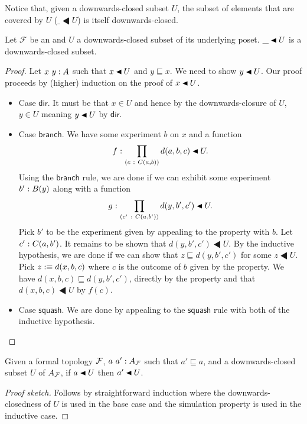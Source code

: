 Notice that, given a downwards-closed subset $U$, the subset of elements that are covered
by $U$ ($\_ \LHD U$) is itself downwards-closed.
\begin{prop}
  Let $\mathcal{F}$ be an \verintrsys{} and $U$ a downwards-closed subset of its
  underlying poset. $\covers{\_}{U}$ is a downwards-closed subset.
\end{prop}
\begin{proof}
  Let $x~y:A$ such that $\covers{x}{U}$ and $y \sqsubseteq x$. We need to show
  $\covers{y}{U}$. Our proof proceeds by (higher) induction on the proof of
  $\covers{x}{U}$.
  \begin{itemize}
    \item Case $\mathsf{dir}$. It must be that $x \in U$ and hence by the downwards-closure
      of $U$, $y \in U$ meaning $\covers{y}{U}$ by $\mathsf{dir}$.
    \item Case $\mathsf{branch}$. We have some experiment $b$ on $x$ and a function
      $$\oftyI{f}{\pity{c}{C(a, b)}{d(a, b, c) \LHD U}}.$$
      Using the $\mathsf{branch}$ rule, we are done if we can exhibit some experiment
      $b'\hspace{0.1mm}:\hspace{0.1mm}B(y)$ along with a function
      $$\oftyI{g}{\pity{c'}{C(a, b')}{d(y, b', c') \LHD U}}.$$
      Pick $b'$ to be the experiment given by appealing to the \versim{} property with
      $b$. Let $c'\hspace{0.1mm}:\hspace{0.1mm}C(a, b')$. It remains to be shown that $d(y, b', c') \LHD U$.
      By the inductive hypothesis, we are done if we can show that $z \sqsubseteq d(y, b', c')$
      for some $z \LHD U$. Pick $z :\equiv d(x, b, c)$ where $c$ is the outcome of $b$ given
      by the \versim{} property. We have $d(x, b, c) \sqsubseteq d(y, b', c')$, directly by the
      \versim{} property and that $d(x, b, c) \LHD U$ by $f(c)$.
    \item Case $\mathsf{squash}$. We are done by appealing to the $\mathsf{squash}$ rule
      with both of the inductive hypothesis.
  \end{itemize}
\end{proof}

\begin{prop}\label{prop:lem1}
  Given a formal topology $\mathcal{F}{}$, $a~a':A_{\mathcal{F}{}}$ such that $a' \sqsubseteq a$, and a
  downwards-closed subset $U$ of $A_{\mathcal{F}{}}$, if $\covers{a}{U}$ then $\covers{a'}{U}$.
\end{prop}
\begin{proof}[Proof sketch]
  Follows by straightforward induction where the downwards-closedness of $U$ is used
  in the base case and the simulation property is used in the inductive case.
\end{proof}

